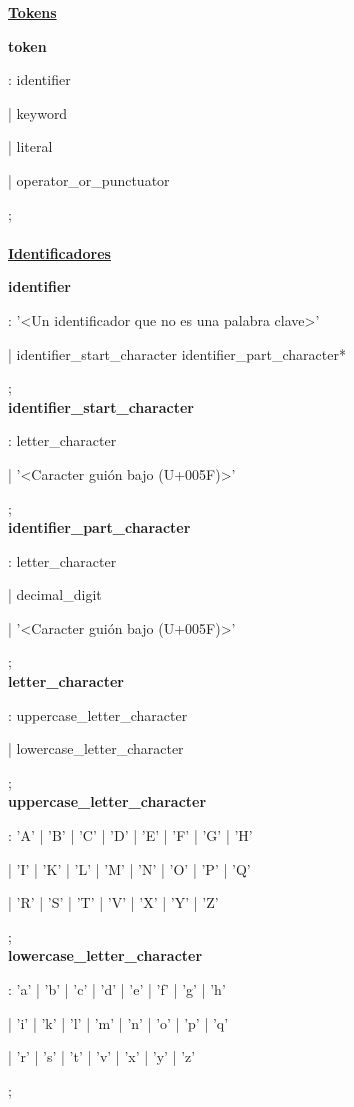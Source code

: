 \documentclass[12pt, letterpaper,spanish]{article}
\theoremstyle{definition}
\theoremstyle{remark}
\begin{document}
	\underline{\textbf{Tokens}}\par
	\textbf{token}\par
	: identifier\par
	| keyword\par
	| literal\par
	| operator\_or\_punctuator\par
	; \\ \\
	
	\underline{\textbf{Identificadores}}\par
	\textbf{identifier}\par
	: '<Un identificador que no es una palabra clave>'\par
	| identifier\_start\_character identifier\_part\_character*\par
	; \\
	
	\textbf{identifier\_start\_character}\par
	: letter\_character\par
	| '<Caracter guión bajo (U+005F)>'\par
	; \\
	
	\textbf{identifier\_part\_character}\par
	: letter\_character\par
	| decimal\_digit\par
	| '<Caracter guión bajo (U+005F)>'\par
	; \\
	
	\textbf{letter\_character}\par
	: uppercase\_letter\_character\par
	| lowercase\_letter\_character\par
	; \\
	
	\textbf{uppercase\_letter\_character}\par
	: 'A' | 'B' | 'C' | 'D' | 'E' | 'F' | 'G' | 'H'\par 
	| 'I' | 'K' | 'L' | 'M' | 'N' | 'O' | 'P' | 'Q'\par 
	| 'R' | 'S' | 'T' | 'V' | 'X' | 'Y' | 'Z'\par    
	; \\
	
	\textbf{lowercase\_letter\_character}\par
	: 'a' | 'b' | 'c' | 'd' | 'e' | 'f' | 'g' | 'h'\par 
	| 'i' | 'k' | 'l' | 'm' | 'n' | 'o' | 'p' | 'q'\par
	| 'r' | 's' | 't' | 'v' | 'x' | 'y' | 'z'\par
	; \\
	
\end{document}
